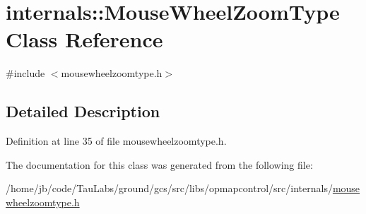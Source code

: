 \hypertarget{classinternals_1_1_mouse_wheel_zoom_type}{\section{internals\-:\-:\-Mouse\-Wheel\-Zoom\-Type \-Class \-Reference}
\label{classinternals_1_1_mouse_wheel_zoom_type}
}


{\ttfamily \#include $<$mousewheelzoomtype.\-h$>$}



\subsection{\-Detailed \-Description}


\-Definition at line 35 of file mousewheelzoomtype.\-h.



\-The documentation for this class was generated from the following file\-:\begin{DoxyCompactItemize}
\item 
/home/jb/code/\-Tau\-Labs/ground/gcs/src/libs/opmapcontrol/src/internals/\hyperlink{mousewheelzoomtype_8h}{mousewheelzoomtype.\-h}\end{DoxyCompactItemize}
